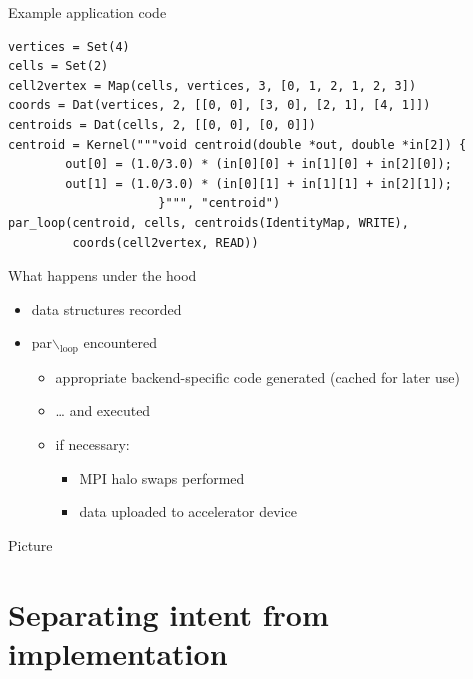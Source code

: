 \documentclass[presentation]{beamer}
\begin{document}
\begin{frame}[fragile,label={sec:orgheadline10}]{Example application code}
 \begin{center}

\end{center}
\begin{verbatim}
vertices = Set(4)
cells = Set(2)
cell2vertex = Map(cells, vertices, 3, [0, 1, 2, 1, 2, 3])
coords = Dat(vertices, 2, [[0, 0], [3, 0], [2, 1], [4, 1]])
centroids = Dat(cells, 2, [[0, 0], [0, 0]])
centroid = Kernel("""void centroid(double *out, double *in[2]) {
        out[0] = (1.0/3.0) * (in[0][0] + in[1][0] + in[2][0]);
        out[1] = (1.0/3.0) * (in[0][1] + in[1][1] + in[2][1]);
                     }""", "centroid")
par_loop(centroid, cells, centroids(IdentityMap, WRITE),
         coords(cell2vertex, READ))
\end{verbatim}
\end{frame}

\begin{frame}[label={sec:orgheadline11}]{What happens under the hood}
\begin{itemize}
\item data structures recorded
\item par$\backslash$\(_{\text{loop}}\) encountered
\begin{itemize}
\item appropriate backend-specific code generated (cached for later use)
\item \ldots{} and executed
\item if necessary:
\begin{itemize}
\item MPI halo swaps performed
\item data uploaded to accelerator device
\end{itemize}
\end{itemize}
\end{itemize}
\end{frame}

\begin{frame}[label={sec:orgheadline12}]{Picture}
\begin{center}

\end{center}
\end{frame}

\section{Separating intent from implementation}
\label{sec:orgheadline20}
\end{document}

